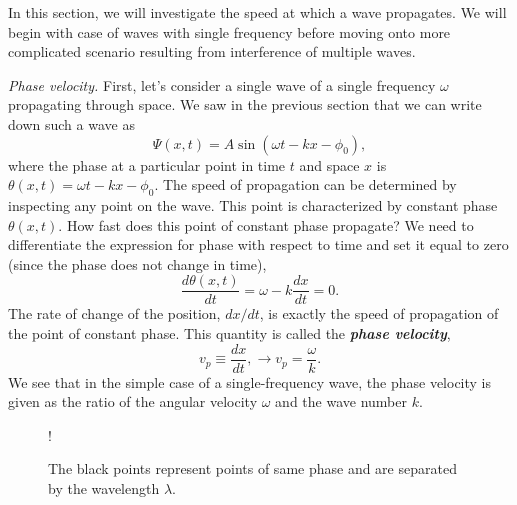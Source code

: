 In this section, we will investigate the speed at which a wave propagates.
We will begin with case of waves with single frequency before moving onto more complicated scenario resulting from interference of multiple waves.

\emph{Phase velocity.}
First, let's consider a single wave of a single frequency $\omega$ propagating through space.
We saw in the previous section that we can write down such a wave as
\begin{equation}
    \Psi(x,t) = A \sin(\omega t - kx - \phi_0),
\end{equation}
where the phase at a particular point in time $t$ and space $x$ is $\theta(x,t)=\omega t-k x-\phi_0$.
The speed of propagation can be determined by inspecting any point on the wave.
This point is characterized by constant phase $\theta(x,t)$.
How fast does this point of constant phase propagate?
We need to differentiate the expression for phase with respect to time and set it equal to zero (since the phase does not change in time),
\begin{equation}
    \frac{d\theta(x,t)}{d t} = \omega - k\frac{dx}{dt} = 0.
\end{equation}
The rate of change of the position, $dx/dt$, is exactly the speed of propagation of the point of constant phase.
This quantity is called the \textbf{\emph{phase velocity}},
\begin{equation}
    v_p \equiv \frac{dx}{dt}, \longrightarrow v_p = \frac{\omega}{k}.
    \label{eq:6-2_phase_velocity}
\end{equation}
We see that in the simple case of a single-frequency wave, the phase velocity is given as the ratio of the angular velocity $\omega$ and the wave number $k$.

\begin{figure}[t]
    \centering
    \resizebox {0.6\textwidth} {!} {
    }   
    \caption[Phase velocity.]{The black points represent points of same phase and are separated by the wavelength $\lambda$.}
    \label{fig:6-2_phase_velocity}
\end{figure}

